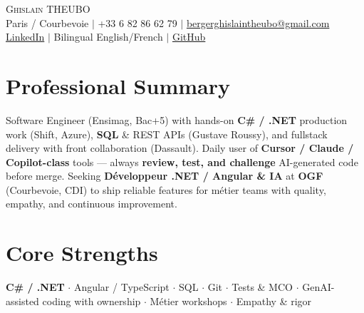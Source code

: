 \documentclass[letterpaper,10.5pt]{article}
\begin{document}
\begin{center}
{\Huge \scshape Ghislain THEUBO} \\ \vspace{2pt}
\small Paris / Courbevoie $|$ +33 6 82 86 62 79 $|$ \href{mailto:bergerghislaintheubo@gmail.com}{bergerghislaintheubo@gmail.com} \\
\href{https://www.linkedin.com/in/berger-ghislain}{LinkedIn} $|$ Bilingual English/French $|$ \href{https://github.com/Bergerghislain}{GitHub}
\end{center}
\vspace{-6pt}
\section{Professional Summary}
\small{Software Engineer (Ensimag, Bac+5) with hands-on \textbf{C\# / .NET} production work (Shift, Azure), \textbf{SQL} \& REST APIs (Gustave Roussy), and fullstack delivery with front collaboration (Dassault). Daily user of \textbf{Cursor / Claude / Copilot-class} tools --- always \textbf{review, test, and challenge} AI-generated code before merge. Seeking \textbf{D\'eveloppeur .NET / Angular \& IA} at \textbf{OGF} (Courbevoie, CDI) to ship reliable features for m\'etier teams with quality, empathy, and continuous improvement.}
\section{Core Strengths}
\small{\textbf{C\# / .NET} $\cdot$ Angular / TypeScript $\cdot$ SQL $\cdot$ Git $\cdot$ Tests \& MCO $\cdot$ GenAI-assisted coding with ownership $\cdot$ M\'etier workshops $\cdot$ Empathy \& rigor}
\end{document}
